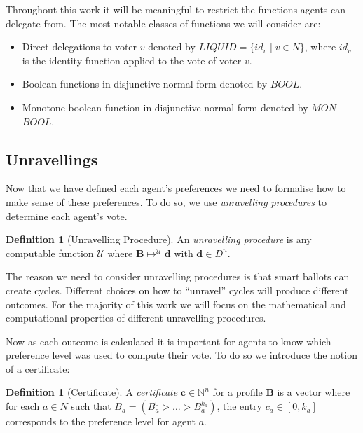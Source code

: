 \documentclass[11pt,a4paper, titlepage]{article}
\theoremstyle{definition}
\newtheorem{definition}[theorem]{Definition}
\let\vec\mathbf
\begin{document}
Throughout this work it will be meaningful to restrict the functions agents can delegate from. The most notable classes of functions we will consider are: 

\begin{itemize}
    \item Direct delegations to voter $v$ denoted by $\mathit{LIQUID} = \{\mathit{id}_v \mid v \in N\}$, where $\mathit{id}_v$ is the identity function applied to the vote of voter $v$.
    \item Boolean functions in disjunctive normal form denoted by $\mathit{BOOL}$. 
    \item Monotone boolean function in disjunctive normal form denoted by $\mathit{MON}$-$\mathit{BOOL}$.
\end{itemize}


\subsection{Unravellings}

Now that we have defined each agent's preferences we need to formalise how to make sense of these preferences. To do so, we use \emph{unravelling procedures} to determine each agent's vote.

\begin{definition}[Unravelling Procedure]
    An \emph{unravelling procedure} is any computable function $\mathcal{U}$ where $\mathbf{B} \mapsto^\mathcal{U} \vec{d}$ with $\vec{d} \in D^n$.
\end{definition}

The reason we need to consider unravelling procedures is that smart ballots can create cycles.
Different choices on how to ``unravel'' cycles will produce different outcomes.
For the majority of this work we will focus on the mathematical and computational properties of different unravelling procedures.


Now as each outcome is calculated it is important for agents to know which preference level was used to compute their vote. 
To do so we introduce the notion of a certificate:

\begin{definition}[Certificate]
    A \emph{certificate} $\mathbf{c} \in \mathbb{N}^n$ for a profile $\mathbf{B}$ is a vector where for each $a \in N$ such that $B_a = (B_a^0 > \ldots > B_a^{k_a})$, the entry $c_a \in [0, k_a]$ corresponds to the preference level for agent $a$.  
\end{definition}
\end{document}
